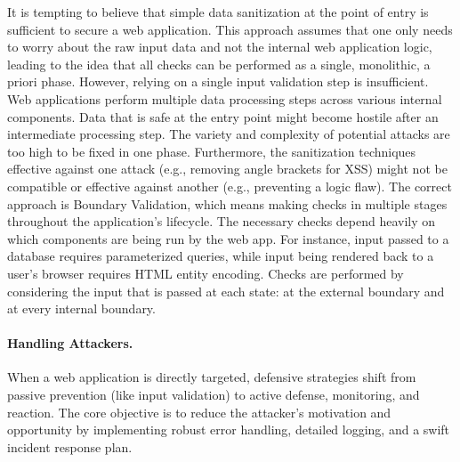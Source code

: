 \begin{itemize}
          It is tempting to believe that simple data sanitization at the point of entry is sufficient to secure a web application. This approach assumes that one only needs to worry about the raw input data and not the internal web application logic, leading to the idea that all checks can be performed as a single, monolithic, a priori phase. However, relying on a single input validation step is insufficient. Web applications perform multiple data processing steps across various internal components. Data that is safe at the entry point might become hostile after an intermediate processing step. The variety and complexity of potential attacks are too high to be fixed in one phase. Furthermore, the sanitization techniques effective against one attack (e.g., removing angle brackets for XSS) might not be compatible or effective against another (e.g., preventing a logic flaw). The correct approach is Boundary Validation, which means making checks in multiple stages throughout the application's lifecycle. The necessary checks depend heavily on which components are being run by the web app. For instance, input passed to a database requires parameterized queries, while input being rendered back to a user's browser requires HTML entity encoding. Checks are performed by considering the input that is passed at each state: at the external boundary and at every internal boundary.
\end{itemize}

\paragraph{Handling Attackers.} When a web application is directly targeted, defensive strategies shift from passive prevention (like input validation) to active defense, monitoring, and reaction. The core objective is to reduce the attacker's motivation and opportunity by implementing robust error handling, detailed logging, and a swift incident response plan.

